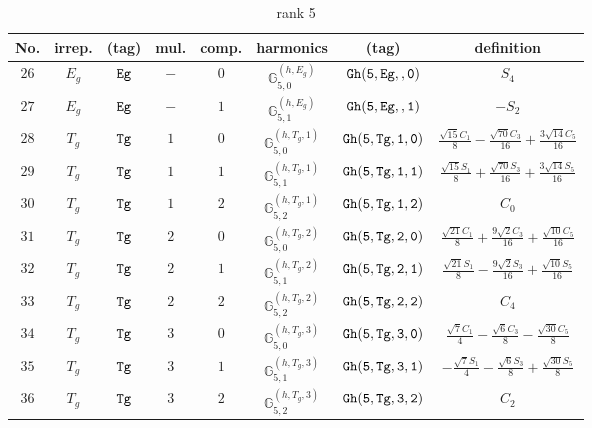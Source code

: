 \documentclass[fleqn,8pt]{jsarticle}
\begin{document}
\begin{table}[ht!]
\begin{center}
\caption{rank 5}
\renewcommand{\arraystretch}{1.3}
\begin{tabular}{cccccccc} \hline \hline
No. & irrep. & (tag) & mul. & comp. & harmonics & (tag) & definition \\ \hline
$ 26 $ & $ E_{g} $ & $ {\tt Eg} $ & $ - $ & $ 0 $ & $ \mathbb{G}_{5,0}^{(h,E_{g})} $ & $ {\tt Gh(5,Eg,,0)} $ & $ S_{4} $ \\
$ 27 $ & $ E_{g} $ & $ {\tt Eg} $ & $ - $ & $ 1 $ & $ \mathbb{G}_{5,1}^{(h,E_{g})} $ & $ {\tt Gh(5,Eg,,1)} $ & $ - S_{2} $ \\
$ 28 $ & $ T_{g} $ & $ {\tt Tg} $ & $ 1 $ & $ 0 $ & $ \mathbb{G}_{5,0}^{(h,T_{g},1)} $ & $ {\tt Gh(5,Tg,1,0)} $ & $ \frac{\sqrt{15} C_{1}}{8} - \frac{\sqrt{70} C_{3}}{16} + \frac{3 \sqrt{14} C_{5}}{16} $ \\
$ 29 $ & $ T_{g} $ & $ {\tt Tg} $ & $ 1 $ & $ 1 $ & $ \mathbb{G}_{5,1}^{(h,T_{g},1)} $ & $ {\tt Gh(5,Tg,1,1)} $ & $ \frac{\sqrt{15} S_{1}}{8} + \frac{\sqrt{70} S_{3}}{16} + \frac{3 \sqrt{14} S_{5}}{16} $ \\
$ 30 $ & $ T_{g} $ & $ {\tt Tg} $ & $ 1 $ & $ 2 $ & $ \mathbb{G}_{5,2}^{(h,T_{g},1)} $ & $ {\tt Gh(5,Tg,1,2)} $ & $ C_{0} $ \\
$ 31 $ & $ T_{g} $ & $ {\tt Tg} $ & $ 2 $ & $ 0 $ & $ \mathbb{G}_{5,0}^{(h,T_{g},2)} $ & $ {\tt Gh(5,Tg,2,0)} $ & $ \frac{\sqrt{21} C_{1}}{8} + \frac{9 \sqrt{2} C_{3}}{16} + \frac{\sqrt{10} C_{5}}{16} $ \\
$ 32 $ & $ T_{g} $ & $ {\tt Tg} $ & $ 2 $ & $ 1 $ & $ \mathbb{G}_{5,1}^{(h,T_{g},2)} $ & $ {\tt Gh(5,Tg,2,1)} $ & $ \frac{\sqrt{21} S_{1}}{8} - \frac{9 \sqrt{2} S_{3}}{16} + \frac{\sqrt{10} S_{5}}{16} $ \\
$ 33 $ & $ T_{g} $ & $ {\tt Tg} $ & $ 2 $ & $ 2 $ & $ \mathbb{G}_{5,2}^{(h,T_{g},2)} $ & $ {\tt Gh(5,Tg,2,2)} $ & $ C_{4} $ \\
$ 34 $ & $ T_{g} $ & $ {\tt Tg} $ & $ 3 $ & $ 0 $ & $ \mathbb{G}_{5,0}^{(h,T_{g},3)} $ & $ {\tt Gh(5,Tg,3,0)} $ & $ \frac{\sqrt{7} C_{1}}{4} - \frac{\sqrt{6} C_{3}}{8} - \frac{\sqrt{30} C_{5}}{8} $ \\
$ 35 $ & $ T_{g} $ & $ {\tt Tg} $ & $ 3 $ & $ 1 $ & $ \mathbb{G}_{5,1}^{(h,T_{g},3)} $ & $ {\tt Gh(5,Tg,3,1)} $ & $ - \frac{\sqrt{7} S_{1}}{4} - \frac{\sqrt{6} S_{3}}{8} + \frac{\sqrt{30} S_{5}}{8} $ \\
$ 36 $ & $ T_{g} $ & $ {\tt Tg} $ & $ 3 $ & $ 2 $ & $ \mathbb{G}_{5,2}^{(h,T_{g},3)} $ & $ {\tt Gh(5,Tg,3,2)} $ & $ C_{2} $ \\
 \hline \hline
\end{tabular}
\end{center}
\end{table}
\end{document}
